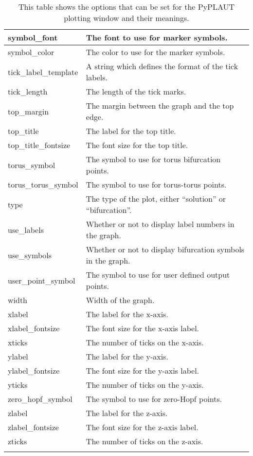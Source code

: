 \documentclass[12pt]{report}
\begin{document}
\begin{longtable}{| l | l |}
 \hline
 symbol\_font  &  The font to use for marker symbols. \\
 \hline
 symbol\_color  & The color to use for the marker symbols. \\
 \hline
 tick\_label\_template  & A string which defines the format of the tick labels. \\
 \hline
 tick\_length  &  The length of the tick marks. \\
 \hline
 top\_margin  & The margin between the graph and the top edge. \\
 \hline
 top\_title  &    The label for the top title. \\ 
 \hline
 top\_title\_fontsize  & The font size for the top title. \\ 
 \hline
 torus\_symbol  &    The symbol to use for torus bifurcation points. \\ 
 \hline
 torus\_torus\_symbol & The symbol to use for torus-torus points. \\
 \hline
 type  & The type of the plot, either ``solution'' or ``bifurcation''. \\  
 \hline
 use\_labels &   Whether or not to display label numbers in the graph. \\ 
 \hline
 use\_symbols  & Whether or not to display bifurcation symbols in the graph. \\
 \hline
 user\_point\_symbol  &   The symbol to use for user defined output points. \\ 
 \hline
 width  & Width of the graph. \\
 \hline
 xlabel  & The label for the x-axis. \\
 \hline
 xlabel\_fontsize  & The font size for the x-axis label. \\
 \hline
 xticks  & The number of ticks on the x-axis. \\
 \hline
 ylabel  & The label for the y-axis. \\
 \hline
 ylabel\_fontsize  & The font size for the y-axis label. \\
 \hline
 yticks  & The number of ticks on the y-axis. \\
 \hline
 zero\_hopf\_symbol & The symbol to use for zero-Hopf points. \\
 \hline
 zlabel  & The label for the z-axis. \\
 \hline
 zlabel\_fontsize  & The font size for the z-axis label. \\
 \hline
 zticks  & The number of ticks on the z-axis. \\
 \hline
 \caption[The options for the PyPLAUT plotting window.]
 {This table shows the options that
 can be set for the PyPLAUT plotting window and their meanings.}
 \label{tbl:clui plotter specific options}
 \end{longtable}
\end{document}

